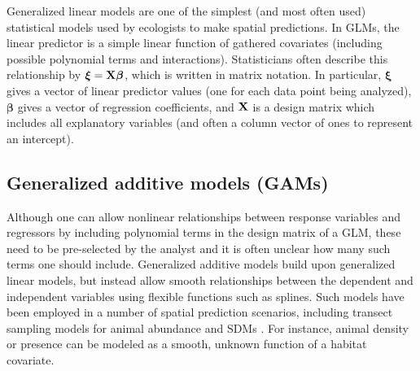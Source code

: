 \documentclass[12pt,fleqn]{article}
\begin{document}
\begin{flushleft}
Generalized linear models \citep{McCullaghNelder1989} are one of the simplest (and most often used) statistical models
used by ecologists to make spatial predictions. In GLMs, the linear predictor is a simple linear function of gathered covariates
(including possible polynomial terms and interactions).  Statisticians often describe this relationship by
$\boldsymbol{\xi}={\bf X} \boldsymbol{\beta}$, which is written in matrix notation.  In particular, $\boldsymbol{\xi}$ gives
a vector of linear predictor values (one for each data point being analyzed), $\boldsymbol{\beta}$ gives a vector of regression coefficients, and ${\bf X}$ is a design matrix which includes all explanatory variables (and often a column vector of ones to represent an intercept).

\subsection{Generalized additive models (GAMs)}

Although one can allow nonlinear relationships between response variables and regressors by including polynomial terms in the design matrix of a GLM, these need to be pre-selected by the analyst and it is often unclear how many such terms one should include. Generalized additive models \citep[GAMs;][]{HastieTibshirani1999,Wood2006} build upon generalized linear models, but instead allow smooth relationships between the dependent and independent variables using flexible functions such as splines.  Such models have
been employed in a number of spatial prediction scenarios, including transect sampling models for animal abundance \citep{HedleyBuckland2004} and SDMs \citep{GuisanEtAl2002}.  For instance, animal density or presence can be modeled as a smooth, unknown function of a habitat covariate.


\end{flushleft}
\end{document}
